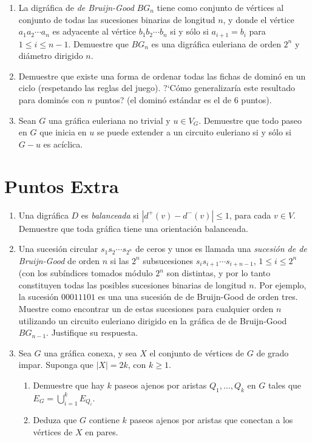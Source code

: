 \documentclass{article}
\begin{document}
\begin{enumerate}
\begin{proof}
    \end{proof}



\item La digr\'afica de {\em de Bruijn-Good} $BG_n$ tiene como
  conjunto de v\'ertices al conjunto de todas las sucesiones
  binarias de longitud $n$, y donde el v\'ertice $a_1 a_2
  \cdots a_n$ es adyacente al v\'ertice $b_1 b_2 \cdots b_n$
  si y s\'olo si $a_{i+1} = b_i$ para $1 \le i \le n-1$.  Demuestre
  que $BG_n$ es una digr\'afica euleriana de orden $2^n$ y
  di\'ametro dirigido $n$.

\item Demuestre que existe una forma de ordenar todas las fichas
  de domin\'o en un ciclo (respetando las reglas del juego).
  ?`C\'omo generalizar\'ia este resultado para domin\'os con
  $n$ puntos? (el domin\'o est\'andar es el de $6$ puntos).

\item Sean $G$ una gr\'afica euleriana no trivial
  y $u \in V_G$. Demuestre que todo paseo en $G$
  que inicia en $u$ se puede extender a un circuito
  euleriano si y s\'olo si $G-u$ es ac\'iclica.

\end{enumerate}

\section*{Puntos Extra}

\begin{enumerate}
\item Una digr\'afica $D$ es {\em balanceada} si $|d^+(v) - d^-(v)|
  \le 1$, para cada $v \in V$.   Demuestre que toda gr\'afica tiene
  una orientaci\'on balanceada.

\item Una sucesi\'on circular $s_1 s_2 \cdots s_{2^n}$ de ceros
  y unos es llamada una {\em sucesi\'on de de Bruijn-Good}
  de orden $n$ si las $2^n$ subsucesiones $s_i s_{i+1} \cdots
  s_{i+n-1}$, $1 \le i \le 2^n$ (con los sub\'indices tomados
  m\'odulo $2^n$ son distintas, y por lo tanto constituyen todas
  las posibles sucesiones binarias de longitud $n$.   Por ejemplo,
  la sucesi\'on $00011101$ es una una sucesi\'on de de Bruijn-Good
  de orden tres.   Muestre como encontrar un de estas sucesiones
  para cualquier orden $n$ utilizando un circuito euleriano dirigido
  en la gr\'afica de de Bruijn-Good $BG_{n-1}$. Justifique su
  respuesta.

\item Sea $G$ una gr\'afica conexa, y sea $X$ el conjunto
  de v\'ertices de $G$ de grado impar.   Suponga que
  $|X| = 2k$, con $k \ge 1$.
  \begin{enumerate}
  \item Demuestre que hay $k$ paseos ajenos por
    aristas $Q_1, \dots, Q_k$ en $G$ tales que
    $E_G = \bigcup_{i=1}^k E_{Q_i}$.

  \item Deduza que $G$ contiene $k$ paseos ajenos
    por aristas que conectan a los v\'ertices de $X$
    en pares.
  \end{enumerate}

\end{enumerate}
\end{document}
